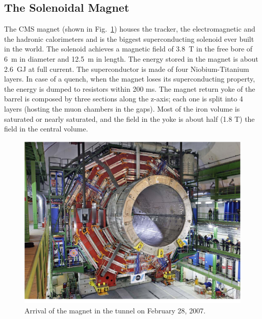 \subsection*{The Solenoidal Magnet}
The CMS magnet (shown in Fig.~\ref{magnetarrival}) houses the tracker, the electromagnetic and the hadronic
calorimeters and is the biggest superconducting solenoid ever built in the world. The solenoid
achieves a magnetic field of 3.8~T in the free bore of 6~m in diameter and 12.5~m in length.
The energy stored in the magnet is about 2.6~GJ at full current. The superconductor is
made of four Niobium-Titanium layers. In case of a quench, when the magnet loses its
superconducting property, the energy is dumped to resistors within 200 ms. The magnet
return yoke of the barrel is composed by three sections along the z-axis; each one is
split into 4 layers (hosting the muon chambers in the gaps). Most of the iron volume is
saturated or nearly saturated, and the field in the yoke is about half (1.8 T) the
field in the central volume.

\begin{figure}
\centering
\includegraphics[scale= 0.35]{../Cap2/magnet}
\caption{Arrival of the magnet in the tunnel on February 28, 2007.}
\label{magnetarrival}
\end{figure}

